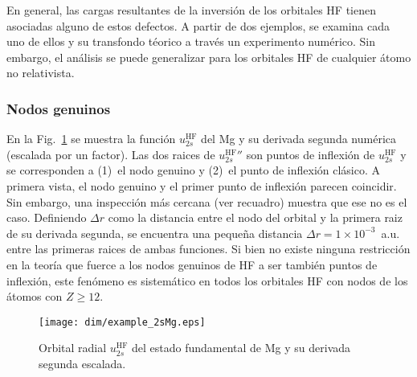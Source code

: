 {{{{%

En general, las cargas resultantes de la inversión de los orbitales HF 
tienen asociadas alguno de estos defectos. A partir de dos ejemplos, 
se examina cada uno de ellos y su transfondo téorico a través un 
experimento numérico. Sin embargo, el análisis se puede generalizar 
para los orbitales HF de cualquier átomo no relativista.

\subsubsection*{Nodos genuinos}

En la Fig.~\ref{fig:example2sMg} se muestra la función 
$u_{2s}^{\mathrm{HF}}$ del Mg y su derivada segunda numérica (escalada 
por un factor). Las dos raices de $u_{2s}^{\mathrm{HF}}''$ son puntos de 
inflexión de $u_{2s}^{\mathrm{HF}}$ y se corresponden a (1)~el nodo 
genuino y (2)~el punto de inflexión clásico. A primera vista, el nodo 
genuino y el primer punto de inflexión parecen coincidir. Sin embargo, 
una inspección más cercana (ver recuadro) muestra que ese no es el caso. 
Definiendo $\Delta r$ como la distancia entre el nodo del orbital y la 
primera raiz de su derivada segunda, se encuentra una pequeña distancia 
$\Delta r=1\times 10^{-3}$~a.u. entre las primeras raices de ambas 
funciones. Si bien no existe ninguna restricción en la teoría que fuerce 
a los nodos genuinos de HF a ser también puntos de inflexión, este 
fenómeno es sistemático en todos los orbitales HF con nodos de los 
átomos con $Z\ge 12$.

\begin{figure}
\vspace{-0.4cm}
\centering
\texttt{[image: dim/example\_2sMg.eps]} 
\vspace{-0.45cm}
\caption[Orbital radial y su derivada segunda.]
{Orbital radial $u_{2s}^{\mathrm{HF}}$ del estado fundamental de Mg y su 
derivada segunda escalada.}
\label{fig:example2sMg}


\end{figure}}}}}
